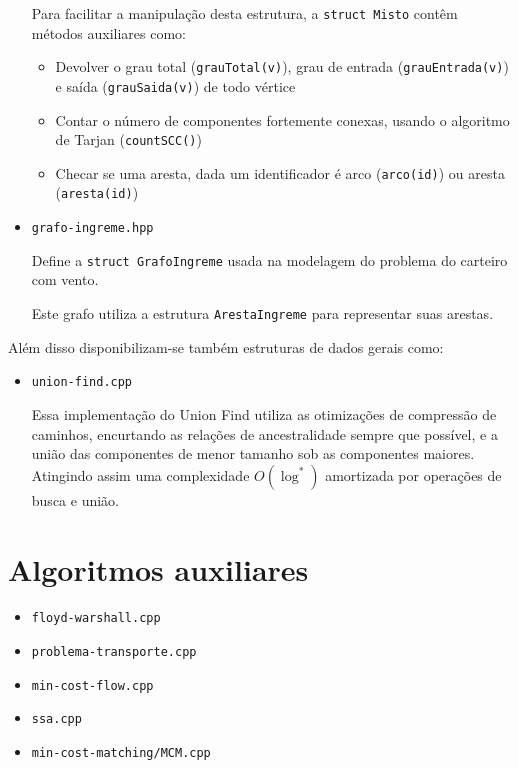 \begin{itemize}
        Para facilitar a manipulação desta estrutura, a \texttt{struct Misto} contêm métodos auxiliares como:
        \begin{itemize}
            \item  Devolver o grau total (\texttt{grauTotal(v)}), grau de entrada (\texttt{grauEntrada(v)}) e saída (\texttt{grauSaida(v)}) de todo vértice
            \item Contar o número de componentes fortemente conexas, usando o algoritmo de Tarjan (\texttt{countSCC()})
            \item Checar se uma aresta, dada um identificador é arco (\texttt{arco(id)}) ou aresta (\texttt{aresta(id)})
        \end{itemize}

    \item \texttt{grafo-ingreme.hpp}

    Define a \texttt{struct GrafoIngreme} usada na modelagem do problema do carteiro com vento.

    Este grafo utiliza a estrutura \texttt{ArestaIngreme} para representar suas arestas.

\end{itemize}

Além disso disponibilizam-se também estruturas de dados gerais como:

\begin{itemize}
    \item \texttt{union-find.cpp}

        Essa implementação do Union Find utiliza as otimizações de compressão de caminhos, encurtando as relações de ancestralidade sempre que possível, e a união das componentes de menor tamanho sob as componentes maiores.
        Atingindo assim uma complexidade $O(\log^*)$ amortizada por operações de busca e união.
\end{itemize}

\section{Algoritmos auxiliares}

\begin{itemize}
    \item \texttt{floyd-warshall.cpp}
    \item \texttt{problema-transporte.cpp}
    \item \texttt{min-cost-flow.cpp}
\end{itemize}

\begin{itemize}
    \item \texttt{ssa.cpp}
    \item \texttt{min-cost-matching/MCM.cpp}
\end{itemize}

